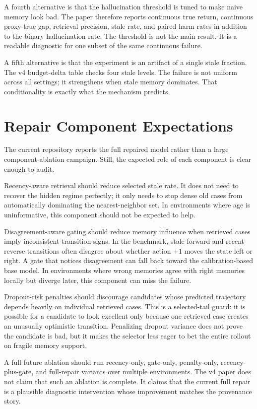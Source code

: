 \documentclass{article}
\begin{document}
A fourth alternative is that the hallucination threshold is tuned to make
naive memory look bad. The paper therefore reports continuous true return,
continuous proxy-true gap, retrieval precision, stale rate, and paired harm
rates in addition to the binary hallucination rate. The threshold is not the
main result. It is a readable diagnostic for one subset of the same continuous
failure.

A fifth alternative is that the experiment is an artifact of a single stale
fraction. The v4 budget-delta table checks four stale levels. The failure is
not uniform across all settings; it strengthens when stale memory dominates.
That conditionality is exactly what the mechanism predicts.

\section{Repair Component Expectations}
\label{app:component-expectations}

The current repository reports the full repaired model rather than a large
component-ablation campaign. Still, the expected role of each component is
clear enough to audit.

Recency-aware retrieval should reduce selected stale rate. It does not need to
recover the hidden regime perfectly; it only needs to stop dense old cases from
automatically dominating the nearest-neighbor set. In environments where age
is uninformative, this component should not be expected to help.

Disagreement-aware gating should reduce memory influence when retrieved cases
imply inconsistent transition signs. In the benchmark, stale forward and recent
reverse transitions often disagree about whether action $+1$ moves the state
left or right. A gate that notices disagreement can fall back toward the
calibration-based base model. In environments where wrong memories agree with
right memories locally but diverge later, this component can miss the failure.

Dropout-risk penalties should discourage candidates whose predicted trajectory
depends heavily on individual retrieved cases. This is a selected-tail guard:
it is possible for a candidate to look excellent only because one retrieved
case creates an unusually optimistic transition. Penalizing dropout variance
does not prove the candidate is bad, but it makes the selector less eager to
bet the entire rollout on fragile memory support.

A full future ablation should run recency-only, gate-only, penalty-only,
recency-plus-gate, and full-repair variants over multiple environments. The v4
paper does not claim that such an ablation is complete. It claims that the
current full repair is a plausible diagnostic intervention whose improvement
matches the provenance story.
\end{document}
